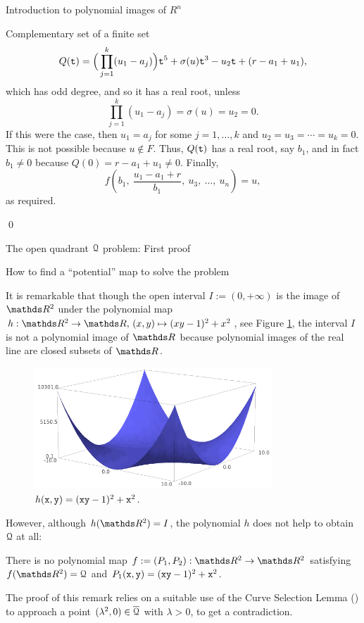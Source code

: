 \documentclass[11pt, a4paper, english, twoside, notitlepage, openright]{report}
\begin{document}
\begin{chapter}{Introduction to polynomial images of $R^n$}
\begin{section}{Complementary set of a finite set}
$$
Q({\tt t})=\Big(\prod_{j=1}^k(u_1-a_j)\Big){\tt t}^{5}+\sigma(u){\tt t}^{3}-u_2{\tt t}+(r-a_1+u_1),
$$
which has odd degree, and so it has a real root, unless 
$$
\prod_{j=1}^k(u_1-a_j)=\sigma(u)=u_2=0.
$$ 
If this were the case, then $u_1=a_j$ for some $j= 1,\dots,k$ and $u_2=u_3=\cdots=u_k=0$. This is not possible because $u\not\in F$. Thus, $Q({\tt t})$ has a real root, say $b_1$, and in fact $b_1\neq0$ because $Q(0)=r-a_1+u_1\neq 0$.
Finally, 
$$
f\left(b_1,\ \frac{u_1-a_1+r}{b_1},\ u_3,\ \dots,\ u_n\right)=u,
$$
as required.

\qed
\end{section}
\end{chapter}

\begin{chapter}{The open quadrant $\mathcal{Q}$ problem: First proof}
\begin{section}{How to find a ``potential'' map to solve the problem}\label{quadReasons}
		
It is remarkable that though the open interval $I:=(0,+\infty)$ is the image of $\R^2$ under the polynomial map $h:\R^2\to\R,\, (x,y)\mapsto (xy-1)^2+x^2$, see Figure \ref{fig:h(x,y)}, the interval $I$ is not a polynomial image of $\R$ because polynomial images of the real line are closed subsets of $\R$.
\begin{figure}[h]
\begin{center}
\includegraphics[width=0.8\textwidth]{plots/ch1_03_f(x,y).png}
\caption{$h({\tt x},{\tt y})=({\tt x}{\tt y}-1)^2+{\tt x}^2$.\label{fig:h(x,y)}}
\end{center}
\end{figure}
		
However, although $h(\R^2)=I$, the polynomial $h$ does not help to obtain $\mathcal{Q}$ at all:
\begin{remark}
There is no polynomial map $f:=(P_1, P_2):\R^2\to\R^2$ satisfying $f(\R^2)=\Qu$ and $P_1({\tt x},{\tt y})=({\tt x}{\tt y}-1)^2+{\tt x}^2$.
\end{remark}
The proof of this remark relies on a suitable use of the Curve Selection Lemma (\cite[VIII.2.6]{abr}) to approach a point $(\lambda^2,0)\in\overline{\mathcal{Q}}$ with $\lambda>0$, to get a contradiction.
		

\end{section}
\end{chapter}
\end{document}
